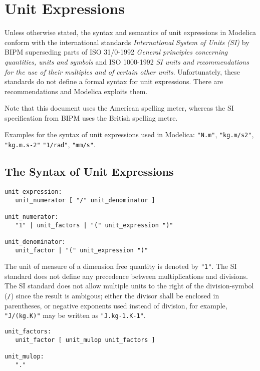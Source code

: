 \chapter{Unit Expressions}

Unless otherwise stated, the syntax and semantics of unit expressions in
Modelica conform with the international standards
\emph{International System of Units (SI)} by BIPM superseding parts of
ISO 31/0-1992
\emph{General principles concerning quantities, units and symbols} and ISO
1000-1992 \emph{SI units and recommendations for the use of their multiples
and of certain other units}.
Unfortunately, these standards do not define a formal syntax for
unit expressions. There are recommendations and Modelica exploits them.

Note that this document uses the American spelling meter, whereas the SI specification from BIPM uses the British spelling metre.

Examples for the syntax of unit expressions used in Modelica: \lstinline!"N.m"!,
\lstinline!"kg.m/s2"!, \lstinline!"kg.m.s-2"! \lstinline!"1/rad"!,
\lstinline!"mm/s"!.

\section{The Syntax of Unit Expressions}
\begin{lstlisting}[language=grammar]
unit_expression:
   unit_numerator [ "/" unit_denominator ]

unit_numerator:
   "1" | unit_factors | "(" unit_expression ")"

unit_denominator:
   unit_factor | "(" unit_expression ")"
\end{lstlisting}

The unit of measure of a dimension free quantity is denoted by \lstinline!"1"!. The
SI standard does not define any precedence between multiplications and
divisions. The SI standard does not allow multiple units to the right of the
division-symbol (\lstinline!/!) since the result is ambigous; either the divisor shall be enclosed in parentheses,
or negative exponents used instead of division, for example, \lstinline!"J/(kg.K)"! may be written as \lstinline!"J.kg-1.K-1"!.

\begin{lstlisting}[language=grammar]
unit_factors:
   unit_factor [ unit_mulop unit_factors ]

unit_mulop:
   "."
\end{lstlisting}

